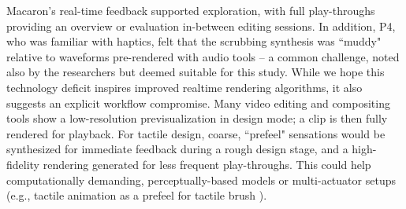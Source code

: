     Macaron's real-time feedback supported exploration, with full play-throughs providing an overview or  evaluation in-between editing sessions.
    In addition, P4, who was familiar with haptics, felt that the scrubbing synthesis  was ``muddy" relative to waveforms pre-rendered with audio tools -- a common challenge, noted also by the researchers but deemed suitable for this study.
    While we hope this technology deficit inspires improved realtime rendering algorithms, it also suggests an explicit workflow compromise.
    Many video editing and compositing tools show a low-resolution previsualization in design mode; a clip is then fully rendered for playback.
    For tactile design, coarse, ``prefeel" sensations would be synthesized for immediate feedback during a rough design stage, and a high-fidelity rendering generated for less frequent play-throughs.
    This %
    could help computationally demanding, perceptually-based models or multi-actuator setups (e.g., tactile animation \cite{Schneider2015} as a prefeel for tactile brush \cite{Israr2011a}).

